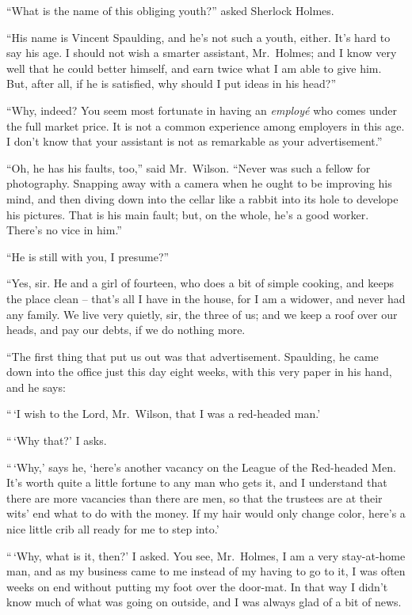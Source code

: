 “What is the name of this obliging youth?” asked Sherlock
Holmes.

“His name is Vincent Spaulding, and he’s not such a youth,
either. It’s hard to say his age. I should not wish a smarter
assistant, Mr.~Holmes; and I know very well that he could
better himself, and earn twice what I am able to give him.
But, after all, if he is satisfied, why should I put ideas in his
head?”

“Why, indeed? You seem most fortunate in having an
\textit{employé} who comes under the full market price. It is not a
common experience among employers in this age. I don’t
know that your assistant is not as remarkable as your
advertisement.”

“Oh, he has his faults, too,” said Mr.~Wilson. “Never
was such a fellow for photography. Snapping away with a
camera when he ought to be improving his mind, and then
diving down into the cellar like a rabbit into its hole to
develope his pictures. That is his main fault; but, on the
whole, he’s a good worker. There’s no vice in him.”

“He is still with you, I presume?”

“Yes, sir. He and a girl of fourteen, who does a bit of
simple cooking, and keeps the place clean -- that’s all I have
in the house, for I am a widower, and never had any family.
We live very quietly, sir, the three of us; and we keep a roof
over our heads, and pay our debts, if we do nothing more.

“The first thing that put us out was that advertisement.
Spaulding, he came down into the office just this day eight
weeks, with this very paper in his hand, and he says:

“\,‘I wish to the Lord, Mr.~Wilson, that I was a red-headed
man.’

“\,‘Why that?’ I asks.

“\,‘Why,’ says he, ‘here’s another vacancy on the League of
the Red-headed Men. It’s worth quite a little fortune to any
man who gets it, and I understand that there are more vacancies
than there are men, so that the trustees are at their wits’
end what to do with the money. If my hair would only change
color, here’s a nice little crib all ready for me to step into.’

“\,‘Why, what is it, then?’ I asked. You see, Mr.~Holmes, I
am a very stay-at-home man, and as my business came to me
instead of my having to go to it, I was often weeks on end
without putting my foot over the door-mat. In that way I
didn’t know much of what was going on outside, and I was
always glad of a bit of news.

